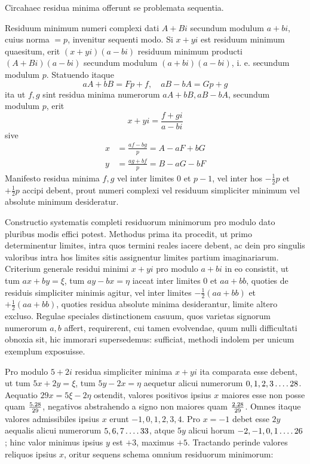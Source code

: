Circa\textperiodcentered haec residua minima offerunt se problemata sequentia.

Residuum minimum numeri complexi dati $A+Bi$ secundum modulum $a+bi$, cuius norma $=p$, invenitur sequenti modo. Si $x+yi$ est residuum minimum quaesitum, erit $(x+yi)(a-bi)$ residuum minimum producti $(A+Bi)(a-bi)$ secundum modulum $(a+bi)(a-bi)$, i. e. secundum modulum $p$. Statuendo itaque
\[
aA+bB=Fp+f,\quad aB-bA=Gp+g
\]
ita ut $f,g$ sint residua minima numerorum $aA+bB,aB-bA$, secundum modulum $p$, erit
%
\[
x+yi=\frac{f+gi}{a-bi}
\]
sive
\[
\begin{aligned}
x&=\frac{af-bg}{p}=A-aF+bG\\
y&=\frac{ag+bf}{p}=B-aG-bF
\end{aligned}
\]
Manifesto residua minima $f,g$ vel inter limites $0$ et $p-1$, vel inter hos $-\frac12p$ et $+\frac12p$ accipi debent, prout numeri complexi vel residuum simpliciter minimum vel absolute minimum desideratur.

Constructio systematis completi residuorum minimorum pro modulo dato pluribus modis effici potest. Methodus prima ita procedit, ut primo determinentur limites, intra quos termini reales iacere debent, ac dein pro singulis valoribus intra hos limites sitis assignentur limites partium imaginariarum. Criterium generale residui minimi $x+yi$ pro modulo $a+bi$ in eo consistit, ut tum $ax+by=\xi$, tum $ay-bx=\eta$ iaceat inter limites $0$ et $aa+bb$, quoties de residuis simpliciter minimis agitur, vel inter limites $-\frac12(aa+bb)$ et $+\frac12(aa+bb)$, quoties residua absolute minima desiderantur, limite altero excluso. Regulae speciales distinctionem casuum, quos varietas signorum numerorum $a,b$ affert, requirerent, cui tamen evolvendae, quum nulli difficultati obnoxia sit, hic immorari supersedemus: sufficiat, methodi indolem per unicum exemplum exposuisse.

Pro modulo $5+2i$ residua simpliciter minima $x+yi$ ita comparata esse debent, ut tum $5x+2y=\xi$, tum $5y-2x=\eta$ aequetur alicui numerorum $0,1,2,3\mathinner{.\,.\,.\,.}28$. Aequatio $29x=5\xi-2\eta$ ostendit, valores positivos ipsius $x$ maiores esse non posse quam $\frac{5\mathbin{.}28}{29}$, negativos abstrahendo a signo non maiores quam $\frac{2\mathbin{.}28}{29}$. Omnes itaque valores admissibiles ipsius $x$ erunt $-1,0,1,2,3,4$. Pro $x=-1$ debet esse $2y$ aequalis alicui numerorum $5,6,7\mathinner{.\,.\,.\,.}33$, atque $5y$ alicui horum $-2,-1,0,1\mathinner{.\,.\,.\,.}26$; hinc valor minimus ipsius $y$ est $+3$, maximus $+5$. Tractando perinde valores reliquos ipsius $x$, oritur sequens schema omnium residuorum minimorum:

